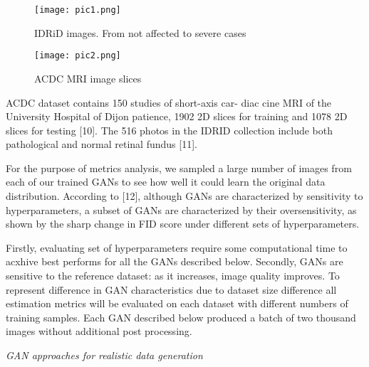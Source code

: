 \documentclass[10pt, a4paper]{article}
\begin{document}
\begin{multicols}{2}


    \begin{figure}[H]
    \flushleft
    \texttt{[image: pic1.png]}
    \caption{IDRiD images. From not affected to severe cases}
\end{figure}
\vspace{-0.45cm}
\begin{figure}[H]
    \flushleft
    \texttt{[image: pic2.png]}
    \caption{ACDC MRI image slices}
\end{figure}

\fontsize{10}{14}\selectfont
ACDC dataset contains 150 studies of short-axis car- diac cine MRI of the University Hospital of Dijon patience, 1902 2D slices for training and 1078 2D slices for testing [10]. The 516 photos in the IDRID collection include both pathological and normal retinal fundus [11].
\vspace{0.5cm}

For the purpose of metrics analysis, we sampled a large number of images from each of our trained GANs to see how well it could learn the original data distribution. According to [12], although GANs are characterized by sensitivity to hyperparameters, a subset of GANs are characterized by their oversensitivity, as shown by the sharp change in FID score under different sets of hyperparameters.

Firstly, evaluating set of hyperparameters require some computational time to acxhive best performs for all the GANs described below.
Secondly, GANs are sensitive to the reference dataset: as it increases, image quality improves. To represent difference in GAN characteristics due to dataset size difference all estimation metrics will be evaluated on each dataset with different numbers of training samples.
Each GAN described below produced a batch of two thousand images without additional post processing.

\vspace{0.4cm}
\textit{GAN approaches for realistic data generation}
\vspace{0.2cm}


\end{multicols}
\end{document}

